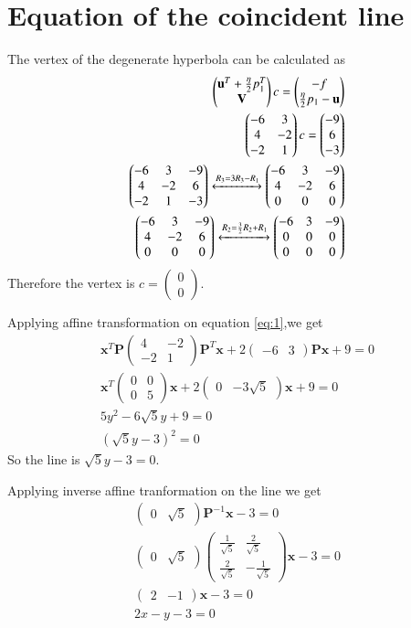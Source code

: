 \documentclass[journal,12pt,twocolumn]{IEEEtran}
\providecommand{\brak}[1]{\ensuremath{\left(#1\right)}}
\newcommand{\myvec}[1]{\ensuremath{\begin{pmatrix}#1\end{pmatrix}}}
\numberwithin{equation}{subsection}
\let\vec\mathbf
\begin{document}
\section{Equation of the coincident line}
The vertex of the degenerate hyperbola can be calculated as
\begin{align}
    \myvec{\vec{u}^T+\frac{\eta}{2}p_1^T\\\vec{V}}c=\myvec{-f\\\frac{\eta}{2}p_1-\vec{u}}\\
    \myvec{-6&3\\4&-2\\-2&1}c=\myvec{-9\\6\\-3}\\
    \myvec{-6&3&-9\\4&-2&6\\-2&1&-3}\xleftrightarrow{R_3=3R_3-R_1}\myvec{-6&3&-9\\4&-2&6\\0&0&0}\\
    \myvec{-6&3&-9\\4&-2&6\\0&0&0}\xleftrightarrow{R_2=\frac{3}{2}R_2+R_1}\myvec{-6&3&-9\\0&0&0\\0&0&0}
\end{align}
Therefore the vertex is $c=\myvec{0\\0}$.\par
Applying affine transformation on equation \eqref{eq:1},we get
\begin{align}
    \vec{x}^T\vec{P}\myvec{4&-2\\-2&1}\vec{P}^T\vec{x}+2\myvec{-6&3}\vec{P}\vec{x}+9=0\\
    \vec{x}^T\myvec{0&0\\0&5}\vec{x}+2\myvec{0&-3\sqrt{5}}\vec{x}+9=0\\
    5y^2-6\sqrt{5}y+9=0\\
    \brak{\sqrt{5}y-3}^2=0
\end{align}
So the line is $\sqrt{5}y-3=0$.\par
Applying inverse affine tranformation on the line we get
\begin{align}
    \myvec{0&\sqrt{5}}\vec{P}^{-1}\vec{x}-3=0\\
    \myvec{0&\sqrt{5}}\myvec{\frac{1}{\sqrt{5}}&\frac{2}{\sqrt{5}}\\\frac{2}{\sqrt{5}}&-\frac{1}{\sqrt{5}}}\vec{x}-3=0\\
    \myvec{2&-1}\vec{x}-3=0\\
    2x-y-3=0
\end{align}
\end{document}
